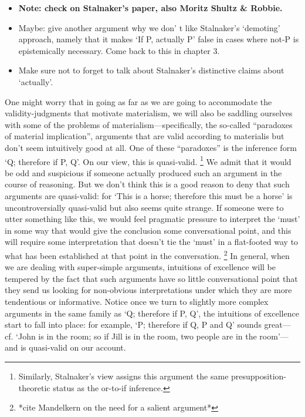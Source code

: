 \documentclass[If.tex]{subfiles}
\begin{document}
\begin{itemize}
	\item
	\textbf{Note: check on Stalnaker's paper, also Moritz Shultz \& Robbie.}
	\item
	Maybe: give another argument why we don' t like Stalnaker's ‘demoting’ approach, namely that it makes ‘If P, actually P’ false in cases where not-P is epistemically necessary. Come back to this in chapter 3. 
	\item
	Make sure not to forget to talk about Stalnaker's distinctive claims about ‘actually’. 
\end{itemize}

One might worry that in going as far as we are going to accommodate the validity-judgments that motivate materialism, we will also be saddling ourselves with some of the problems of materialism---specifically, the so-called “paradoxes of material implication”, arguments that are valid according to materialis  but don't seem intuitively good at all. One of these “paradoxes” is the inference form ‘Q; therefore if P, Q’. On our view, this is quasi-valid.%
\footnote{Similarly, Stalnaker's view assigns this argument the same presupposition-theoretic status as the or-to-if inference.}
 We admit that it would be odd and suspicious if someone actually produced such an argument in the course of reasoning. But we don't think this is a good reason to deny that such arguments are quasi-valid: for ‘This is a horse; therefore this must be a horse’ is uncontroversially quasi-valid but also seems quite strange. If someone were to utter something like this, we would feel pragmatic pressure to interpret the ‘must’ in some way that would give the conclusion some conversational point, and this will require some interpretation that doesn't tie the ‘must’ in a flat-footed way to what has been established at that point in the conversation.%
\footnote{*cite Mandelkern on the need for a salient argument*} 
In general, when we are dealing with super-simple arguments, intuitions of excellence will be tempered by the fact that such arguments have so little conversational point that they send us looking for non-obvious interpretations under which they are more tendentious or informative. Notice once we turn to slightly more complex arguments in the same family as ‘Q; therefore if P, Q’, the intuitions of excellence start to fall into place: for example, ‘P; therefore if Q, P and Q’ sounds great--- cf. ‘John is in the room; so if Jill is in the room, two people are in the room’---and is quasi-valid on our account.
\end{document}
